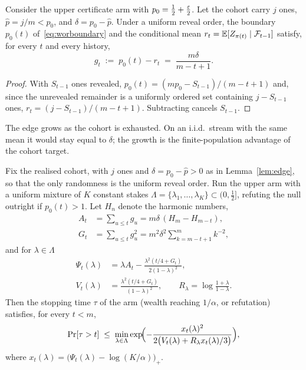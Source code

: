 \begin{lemma}\label{lem:edge}
Consider the upper certificate arm with $p_0=\frac12+\frac{\varepsilon}2$. Let the cohort carry
$j$ ones, $\hat p=j/m<p_0$, and $\delta=p_0-\hat p$. Under a uniform reveal order, the
boundary $p_0(t)$ of~\eqref{eq:worboundary} and the conditional mean
$r_t=\mathbb{E}[Z_{\pi(t)}\mid\mathcal{F}_{t-1}]$ satisfy, for every $t$ and every history,
\[
g_t \;:=\; p_0(t)-r_t \;=\; \frac{m\delta}{m-t+1}.
\]
\end{lemma}

\begin{proof}
With $S_{t-1}$ ones revealed, $p_0(t)=(mp_0-S_{t-1})/(m-t+1)$ and, since the unrevealed
remainder is a uniformly ordered set containing $j-S_{t-1}$ ones,
$r_t=(j-S_{t-1})/(m-t+1)$. Subtracting cancels $S_{t-1}$.
\end{proof}

The edge grows as the cohort is exhausted. On an i.i.d.\ stream with the same mean it
would stay equal to $\delta$; the growth is the finite-population advantage of the
cohort target.

\begin{theorem}\label{thm:growth}
Fix the realised cohort, with $j$ ones and $\delta=p_0-\hat p>0$ as in
Lemma~\ref{lem:edge}, so that the only randomness is the uniform reveal order. Run the
upper arm with a uniform mixture of $K$ constant stakes
$\Lambda=\{\lambda_1,\dots,\lambda_K\}\subset(0,\frac12]$, refuting the null outright if
$p_0(t)>1$. Let $H_n$ denote the harmonic numbers,
\begin{align*}
A_t&=\sum_{u\le t}g_u=m\delta\,(H_m-H_{m-t}),\\
G_t&=\sum_{u\le t}g_u^2=m^2\delta^2\!\!\sum_{k=m-t+1}^{m}\!k^{-2},
\end{align*}
and for $\lambda\in\Lambda$
\begin{align*}
\Psi_t(\lambda)&=\lambda A_t-\frac{\lambda^2(t/4+G_t)}{2(1-\lambda)^2},\\
V_t(\lambda)&=\frac{\lambda^2(t/4+G_t)}{(1-\lambda)^2},\qquad
R_\lambda=\log\frac{1+\lambda}{1-\lambda}.
\end{align*}
Then the stopping time $\tau$ of the arm (wealth reaching $1/\alpha$, or refutation)
satisfies, for every $t<m$,
\[
\Pr[\tau>t]\;\le\;\min_{\lambda\in\Lambda}
\exp\!\Bigl(-\frac{x_t(\lambda)^2}{2\bigl(V_t(\lambda)+R_\lambda x_t(\lambda)/3\bigr)}\Bigr),
\]
where $x_t(\lambda)=\bigl(\Psi_t(\lambda)-\log(K/\alpha)\bigr)_+$.
\end{theorem}

